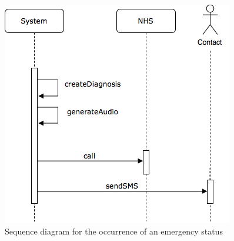 \begin{figure}[H]
    \centering
    \includegraphics[scale=0.5]{rasdL/Pictures/emergency-sequence.png}
    \caption{Sequence diagram for the occurrence of an emergency status}
    
\end{figure}